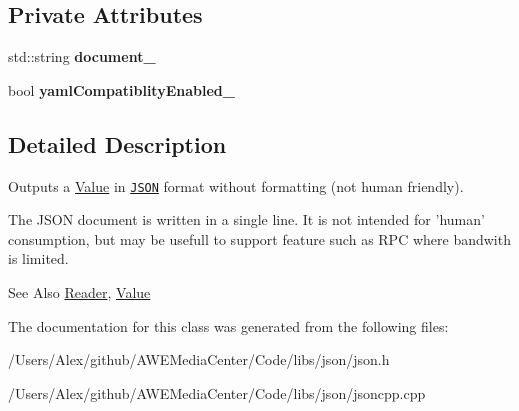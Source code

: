 \subsection*{Private Attributes}
\begin{DoxyCompactItemize}
\item 
\hypertarget{class_json_1_1_fast_writer_afc70d465b79bfc7741ff75294dcefeab}{std\-::string {\bfseries document\-\_\-}}\label{class_json_1_1_fast_writer_afc70d465b79bfc7741ff75294dcefeab}

\item 
\hypertarget{class_json_1_1_fast_writer_a4c4c1911179bf472d24492915b0e489a}{bool {\bfseries yaml\-Compatiblity\-Enabled\-\_\-}}\label{class_json_1_1_fast_writer_a4c4c1911179bf472d24492915b0e489a}

\end{DoxyCompactItemize}


\subsection{Detailed Description}
Outputs a \hyperlink{class_json_1_1_value}{Value} in \href{http://www.json.org}{\tt J\-S\-O\-N} format without formatting (not human friendly). 

The J\-S\-O\-N document is written in a single line. It is not intended for 'human' consumption, but may be usefull to support feature such as R\-P\-C where bandwith is limited. \begin{DoxySeeAlso}{See Also}
\hyperlink{class_json_1_1_reader}{Reader}, \hyperlink{class_json_1_1_value}{Value} 
\end{DoxySeeAlso}


The documentation for this class was generated from the following files\-:\begin{DoxyCompactItemize}
\item 
/\-Users/\-Alex/github/\-A\-W\-E\-Media\-Center/\-Code/libs/json/json.\-h\item 
/\-Users/\-Alex/github/\-A\-W\-E\-Media\-Center/\-Code/libs/json/jsoncpp.\-cpp\end{DoxyCompactItemize}
